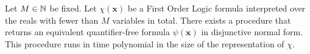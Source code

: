 \begin{theorem}
\label{thm:renegar}
Let $M \in \mathbb{N}$ be fixed. Let $\chi(\mathbf{x})$ be a First Order Logic formula interpreted over the reals with fewer than $M$ variables in total. There exists a procedure that returns an equivalent quantifier-free formula $\psi(\mathbf{x})$ in disjunctive normal form. This procedure runs in time polynomial in the size of the representation of $\chi$.
\end{theorem} 


